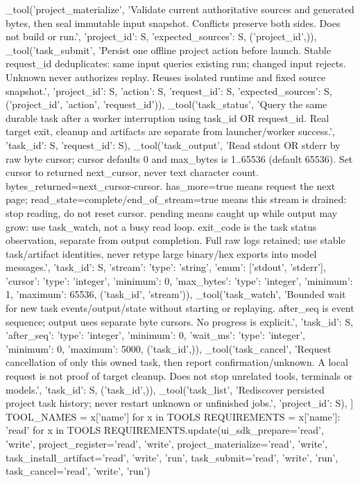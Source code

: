     _tool('project_materialize', 'Validate current authoritative sources and generated bytes, then seal immutable input snapshot. Conflicts preserve both sides. Does not build or run.', {'project_id': S, 'expected_sources': S}, ('project_id',)),
    _tool('task_submit', 'Persist one offline project action before launch. Stable request_id deduplicates: same input queries existing run; changed input rejects. Unknown never authorizes replay. Reuses isolated runtime and fixed source snapshot.', {'project_id': S, 'action': S, 'request_id': S, 'expected_sources': S}, ('project_id', 'action', 'request_id')),
    _tool('task_status', 'Query the same durable task after a worker interruption using task_id OR request_id. Real target exit, cleanup and artifacts are separate from launcher/worker success.', {'task_id': S, 'request_id': S}),
    _tool('task_output', 'Read stdout OR stderr by raw byte cursor; cursor defaults 0 and max_bytes is 1..65536 (default 65536). Set cursor to returned next_cursor, never text character count. bytes_returned=next_cursor-cursor. has_more=true means request the next page; read_state=complete/end_of_stream=true means this stream is drained: stop reading, do not reset cursor. pending means caught up while output may grow: use task_watch, not a busy read loop. exit_code is the task status observation, separate from output completion. Full raw logs retained; use stable task/artifact identities, never retype large binary/hex exports into model messages.', {'task_id': S, 'stream': {'type': 'string', 'enum': ['stdout', 'stderr']}, 'cursor': {'type': 'integer', 'minimum': 0}, 'max_bytes': {'type': 'integer', 'minimum': 1, 'maximum': 65536}}, ('task_id', 'stream')),
    _tool('task_watch', 'Bounded wait for new task events/output/state without starting or replaying. after_seq is event sequence; output uses separate byte cursors. No progress is explicit.', {'task_id': S, 'after_seq': {'type': 'integer', 'minimum': 0}, 'wait_ms': {'type': 'integer', 'minimum': 0, 'maximum': 5000}}, ('task_id',)),
    _tool('task_cancel', 'Request cancellation of only this owned task, then report confirmation/unknown. A local request is not proof of target cleanup. Does not stop unrelated tools, terminals or models.', {'task_id': S}, ('task_id',)),
    _tool('task_list', 'Rediscover persisted project task history; never restart unknown or unfinished jobs.', {'project_id': S}),
]
TOOL_NAMES = {x['name'] for x in TOOLS}
REQUIREMENTS = {x['name']: {'read'} for x in TOOLS}
REQUIREMENTS.update(ui_sdk_prepare={'read', 'write'}, project_register={'read', 'write'}, project_materialize={'read', 'write'},
                    task_install_artifact={'read', 'write', 'run'}, task_submit={'read', 'write', 'run'}, task_cancel={'read', 'write', 'run'})


